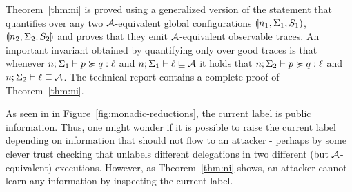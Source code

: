 Theorem~\ref{thm:ni} is proved using a generalized version of the statement that quantifies over any two $\mathcal{A}$-equivalent global configurations $\llparenthesis n_1, \Sigma_1, S_1 \rrparenthesis$, $\llparenthesis n_2, \Sigma_2, S_2 \rrparenthesis$ and proves that they emit $\mathcal{A}$-equivalent observable traces. An important invariant obtained by quantifying only over good traces is that whenever $n; \Sigma_1 \vdash p \succcurlyeq q : \ell$ and $n; \Sigma_1 \vdash \ell \sqsubseteq \mathcal{A}$ it holds that $n; \Sigma_2 \vdash p \succcurlyeq q : \ell$ and $n; \Sigma_2 \vdash \ell \sqsubseteq \mathcal{A}$. The technical report \cite{techreport} contains a complete proof of Theorem~\ref{thm:ni}.

As seen in  in Figure~\ref{fig:monadic-reductions}, the current label is public information. Thus, one might wonder if it is possible to raise the current label depending on information that should not flow to an attacker - perhaps by some clever trust checking that unlabels different delegations in two different (but $\mathcal{A}$-equivalent) executions. However, as Theorem~\ref{thm:ni} shows, an attacker cannot learn any information by inspecting the current label.